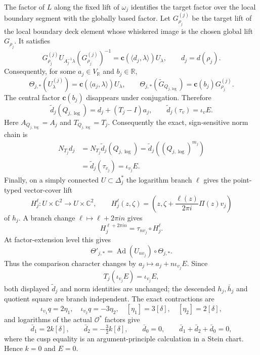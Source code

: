 \begin{enumerate}[leftmargin=1.8em,itemsep=.65em]
The factor of $L$ along the fixed lift of $\omega_j$ identifies the target
factor over the local boundary segment with the globally based factor.  Let
$G_{\rho_j}^{(j)}$ be the target lift of the local boundary deck element
whose whiskered image is the chosen global lift $G_{\rho_j}$.  It satisfies
\[
 G_{\rho_j}^{(j)}U_{A_j^{-1}\lambda}
 (G_{\rho_j}^{(j)})^{-1}
 =\mathbf c(\langle d_j,\lambda\rangle)U_\lambda,
 \qquad d_j=d(\rho_j).
\]
Consequently, for some $a_j\in V_{\mathbb R}$ and $b_j\in\mathbb R$,
\[
 \Theta_{j,*}(U_\lambda^{(j)})
 =\mathbf c(\langle a_j,\lambda\rangle)U_\lambda,\qquad
 \Theta_{j,*}(\widetilde G_{Q_{j,\log}})
 =\mathbf c(b_j)G_{\rho_j}^{(j)}.
\]
The central factor $\mathbf c(b_j)$ disappears under conjugation.  Therefore
\[
 \widetilde d_j(Q_{j,\log})
 =d_j+(T_j-I)a_j,\qquad
 \widetilde d_j(\tau_v)=\iota_vE.
\]
Here
$A_{Q_{j,\log}}=A_j$ and $T_{Q_{j,\log}}=T_j$.  Consequently the exact,
sign-sensitive norm chain is
\[
\begin{aligned}
 N_{T_j}d_j
 &=N_{T_j}\widetilde d_j(Q_{j,\log})
 =\widetilde d_j((Q_{j,\log})^{m_j})\\
 &=\widetilde d_j(\tau_{v_j})
 =\iota_{v_j}E.
\end{aligned}
\]
Finally, on a simply connected $U\subset\Delta_j^*$ the logarithm branch
$\ell$ gives the point-typed vector-cover lift
\[
 H_j^\ell:U\times\mathbb C^2\longrightarrow U\times\mathbb C^2,
 \qquad
 H_j^\ell(z,\zeta)
 =\left(z,\zeta+\frac{\ell(z)}{2\pi i}\Pi(z)v_j\right)
\]
of $h_j$.  A branch change $\ell\mapsto\ell+2\pi i n$ gives
\[
 H_j^{\ell+2\pi i n}=\tau_{nv_j}\circ H_j^\ell.
\]
At factor-extension level this gives
\[
 \Theta'_{j,*}
 =\operatorname{Ad}(U_{nv_j})\circ\Theta_{j,*}.
\]
Thus the comparison character changes by
$a_j\mapsto a_j+n\iota_{v_j}E$.  Since
\[
 T_j(\iota_{v_j}E)=\iota_{v_j}E,
\]
both displayed $\widetilde d_j$ and norm identities are unchanged; the
descended $h_j,\bar h_j$ and quotient square are branch independent.
The exact contractions are
\[
 \iota_{v_1}q=2\eta_1,\quad \iota_{v_2}q=-3\eta_2,\quad
 [\eta_1]=3[\delta],\quad [\eta_2]=2[\delta],
\]
and logarithms of the actual $\mathcal O^*$ factors give
\[
 \bar d_1=2k[\delta],\qquad
 \bar d_2=-\tfrac32k[\delta],\qquad
 \bar d_0=0,\qquad
 \bar d_1+\bar d_2+\bar d_0=0,
\]
where the cusp equality is an argument-principle calculation in a Stein
chart.  Hence $k=0$ and $E=0$.


\end{enumerate}
